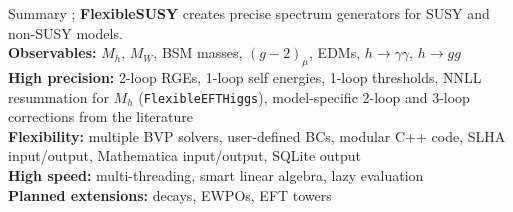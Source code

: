 \documentclass[hyperref={pdfpagelabels=false},ngerman]{beamer}
\renewcommand{\emph}{\textbf}
\begin{document}
\begin{frame}{Summary}
  ;%
  \emph{FlexibleSUSY} creates precise spectrum generators for SUSY and
  non-SUSY models.\\[1em]
  \emph{Observables:} $M_h$, $M_W$, BSM masses, $(g-2)_\mu$, EDMs,
  $h\rightarrow\gamma\gamma$, $h\rightarrow gg$
  \\[0.5em]
  \emph{High precision:} 2-loop RGEs, 1-loop self energies, 1-loop
  thresholds, NNLL resummation for $M_h$ (\texttt{FlexibleEFTHiggs}),
  model-specific 2-loop and 3-loop corrections from the literature
  \\[0.5em]
  \emph{Flexibility:} multiple BVP solvers, user-defined BCs, modular
  C++ code, SLHA input/output, Mathematica input/output, SQLite output
  \\[0.5em]
  \emph{High speed:} multi-threading, smart linear algebra, lazy evaluation
  \\[1em]
  \emph{Planned extensions:} decays, EWPOs, EFT towers
\end{frame}
\end{document}

